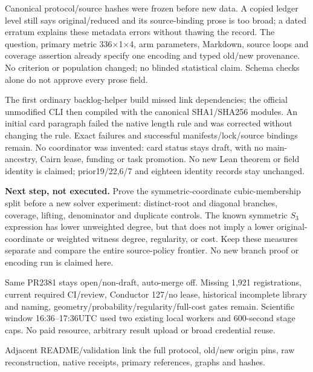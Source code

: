 \documentclass[11pt]{article}
\begin{document}
Canonical protocol/source hashes were frozen before new data. A copied ledger
level still says original/reduced and its source-binding prose is too broad;
a dated erratum explains these metadata errors without thawing the record.
The question, primary metric 336$\times$1$\times$4, arm parameters, Markdown,
source loops and coverage assertion already specify one encoding and typed
old/new provenance. No criterion or population changed; no blinded statistical
claim. Schema checks alone do not approve every prose field.

The first ordinary backlog-helper build missed link dependencies; the official
unmodified CLI then compiled with the canonical SHA1/SHA256 modules. An initial
card paragraph failed the native length rule and was corrected without changing
the rule. Exact failures and successful manifests/lock/source bindings remain.
No coordinator was invented: card status stays draft, with no main-ancestry,
Cairn lease, funding or task promotion. No new Lean theorem or field identity
is claimed; prior19/22,6/7 and eighteen identity records stay unchanged.

\textbf{Next step, not executed.} Prove the symmetric-coordinate cubic-membership
split before a new solver experiment: distinct-root and diagonal branches,
coverage, lifting, denominator and duplicate controls. The known symmetric
$S_3$ expression has lower unweighted degree, but that does not imply a lower
original-coordinate or weighted witness degree, regularity, or cost. Keep
these measures separate and compare the entire source-policy frontier. No new
branch proof or encoding run is claimed here.

Same PR2381 stays open/non-draft, auto-merge off. Missing 1,921 registrations,
current required CI/review, Conductor 127/no lease, historical incomplete library
and naming, geometry/probability/regularity/full-cost gates remain. Scientific
window 16:36--17:36UTC used two existing local workers and 600-second stage caps.
No paid resource, arbitrary result upload or broad credential reuse.

\small Adjacent README/validation link the full protocol, old/new origin pins,
raw reconstruction, native receipts, primary references, graphs and hashes.
\end{document}

